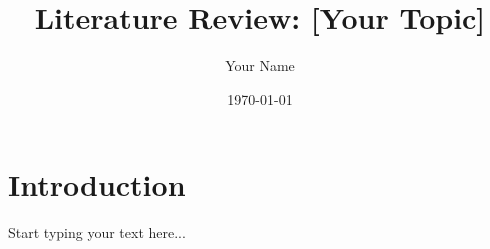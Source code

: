 \documentclass[12pt, a4paper]{article} %
\title{Literature Review: [Your Topic]}
\author{Your Name}
\date{\today}
\begin{document}
\maketitle                             %

\section{Introduction}
Start typing your text here...

\printbibliography                     %
\end{document}
